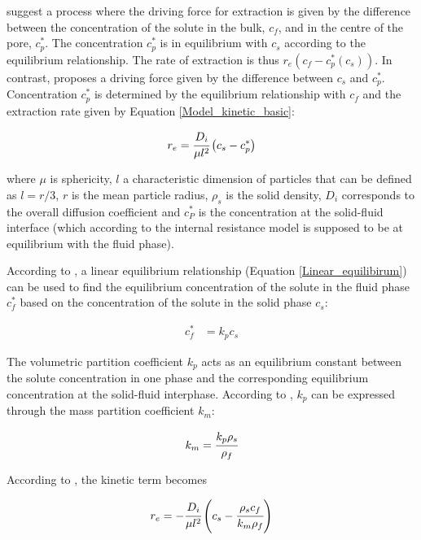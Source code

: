\documentclass[../Article_Model_Parameters.tex]{subfiles}
\begin{document}
			\citet{Bulley1984} suggest a process where the driving force for extraction is given by the difference between the concentration of the solute in the bulk, $c_f$, and in the centre of the pore, $c_p^*$. The concentration $c_p^*$ is in equilibrium with $c_s$ according to the equilibrium relationship. The rate of extraction is thus $r_e\left(c_f - c^*_p(c_s)\right)$. In contrast, \citet{Reverchon1996} proposes a driving force given by the difference between $c_s$ and $c_p^*$. Concentration $c_p^*$ is determined by the equilibrium relationship with $c_f$ and the extraction rate given by Equation \ref{Model_kinetic_basic}:
			
			{\footnotesize
				\begin{equation} \label{Model_kinetic_basic}
					r_e = \cfrac{D_i}{\mu l^2 }\left(c_s - c_p^* \right)
			\end{equation} }
			
			where $\mu$ is sphericity, $l$ a characteristic dimension of particles that can be defined as $l = r/3$, $r$ is the mean particle radius, $\rho_s$ is the solid density, $D_i$ corresponds to the overall diffusion coefficient and $c_P^*$ is the concentration at the solid-fluid interface (which according to the internal resistance model is supposed to be at equilibrium with the fluid phase). 
			
			According to \citet{Bulley1984}, a linear equilibrium relationship (Equation \ref{Linear_equilibirum}) can be used to find the equilibrium concentration of the solute in the fluid phase $c_f^*$ based on the concentration of the solute in the solid phase $c_s$:
			
			{\footnotesize
				\begin{align} \label{Linear_equilibirum}
					c_f^* &= k_p c_s
			\end{align} }
			
			The volumetric partition coefficient $k_p$ acts as an equilibrium constant between the solute concentration in one phase and the corresponding equilibrium concentration at the solid-fluid interphase. According to \citet{Spiro2007}, $k_p$ can be expressed through the mass partition coefficient $k_m$:
			
			{\footnotesize
				\begin{align}
					k_m = \cfrac{k_p \rho_s}{\rho_f}
			\end{align} }
			
			According to \citet{Reverchon1996}, the kinetic term becomes
			
			{\footnotesize
				\begin{equation}
					\label{Model_kinetic_no_sat}
					r_e = -\cfrac{D_i}{ \mu l^2 } \left(c_s - \cfrac{\rho_s c_f}{k_m \rho_f} \right)
			\end{equation} }
			
\end{document}
